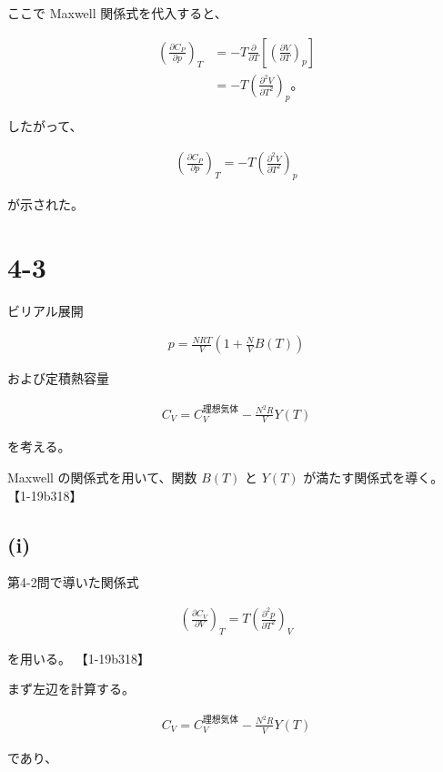 \documentclass[platex,dvipdfmx,a4paper]{jsarticle}
\begin{document}
ここで Maxwell 関係式を代入すると、

\begin{align*}
\left(
\frac{\partial C_P}{\partial p}
\right)_T
&=
-
T
\frac{\partial}{\partial T}
\left[
\left(
\frac{\partial V}{\partial T}
\right)_p
\right] \\
&=
-
T
\left(
\frac{\partial^2V}{\partial T^2}
\right)_p。
\end{align*}

したがって、

\begin{align*}
\left(
\frac{\partial C_P}{\partial p}
\right)_T
=
-T
\left(
\frac{\partial^2V}{\partial T^2}
\right)_p
\end{align*}

が示された。 
\section{4-3}

ビリアル展開

\begin{align*}
p
=
\frac{NRT}{V}
\left(
1+\frac{N}{V}B(T)
\right)
\end{align*}

および定積熱容量

\begin{align*}
C_V
=
C_V^{\mathrm{理想気体}}
-\frac{N^2R}{V}Y(T)
\end{align*}

を考える。

Maxwell の関係式を用いて、関数 $B(T)$ と $Y(T)$ が満たす関係式を導く。 【1-19b318】

\subsection{(i)}

第4-2問で導いた関係式

\begin{align*}
\left(
\frac{\partial C_V}{\partial V}
\right)_T
=
T
\left(
\frac{\partial^2p}{\partial T^2}
\right)_V
\end{align*}

を用いる。 【1-19b318】

まず左辺を計算する。

\begin{align*}
C_V
=
C_V^{\mathrm{理想気体}}
-\frac{N^2R}{V}Y(T)
\end{align*}

であり、
\end{document}
